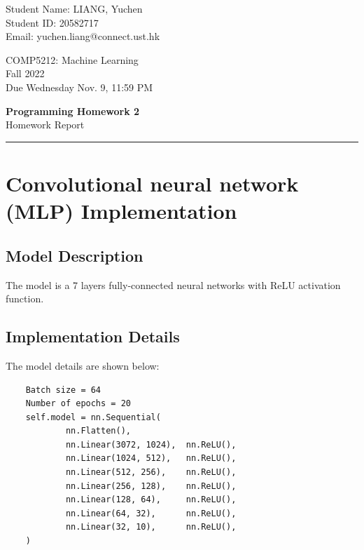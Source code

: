 \documentclass[11pt,letterpaper]{article}
\numberwithin{equation}{section}
\begin{document}
\pagestyle{plain}

\begin{flushleft}
Student Name: LIANG, Yuchen\\
Student ID: 20582717\\
Email: yuchen.liang@connect.ust.hk
\end{flushleft}

\begin{flushright}\vspace{-19mm}
COMP5212: Machine Learning \\
Fall 2022 \\
Due Wednesday Nov. 9, 11:59 PM
\end{flushright}
 
\begin{center}\vspace{0.2cm}
\textbf{\LARGE Programming Homework 2}\\
Homework Report
\end{center}

\rule{\linewidth}{0.5mm}


\section{Convolutional neural network (MLP) Implementation}
\subsection{Model Description}
The model is a 7 layers fully-connected neural networks with ReLU activation function.
\subsection{Implementation Details}
The model details are shown below:
\begin{lstlisting}
    Batch size = 64
    Number of epochs = 20
    self.model = nn.Sequential(
            nn.Flatten(),
            nn.Linear(3072, 1024),  nn.ReLU(),
            nn.Linear(1024, 512),   nn.ReLU(),
            nn.Linear(512, 256),    nn.ReLU(),
            nn.Linear(256, 128),    nn.ReLU(),
            nn.Linear(128, 64),     nn.ReLU(),
            nn.Linear(64, 32),      nn.ReLU(),
            nn.Linear(32, 10),      nn.ReLU(),
    )
\end{lstlisting}
\end{document}
